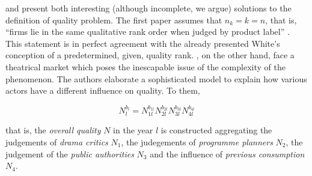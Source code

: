\documentclass[a4paper, 12pt, openright, oneside, german, french, brazil, english, article]{abntex2}
\begin{document}
	 and 
	present both interesting (although incomplete, we argue) solutions to the definition of quality problem. The first paper assumes that $n_k = k = n$, that is, ``firms lie in the same qualitative rank order when judged by product label'' \cite[p. 219]{favereau2002markets}. This statement is in perfect agreement with the already presented White's conception of a predetermined, given, quality rank. , on the other hand, face a theatrical market which poses the inescapable issue of the complexity of the phenomenon. The authors elaborate a sophisticated model to explain how various actors have a different influence on quality. To them,
	
	\begin{equation}
		N_{l}^{b_l} = N_{1l}^{b_{1l}} N_{2l}^{b_{2l}} N_{3l}^{b_{3l}} N_{4l}^{b_{4l}} 
	\end{equation}
	
	that is, the \textit{overall quality} $N$ in the year $l$ is constructed aggregating the judgements of \textit{drama critics} $N_1$, the judegements of \textit{programme planners} $N_2$, the judgement of the \textit{public authorities} $N_3$ and the influence of \textit{previous consumption} $N_4$.
	
	
	
	
	
	
	
	
	
	
		
	
	
	
		
\end{document}
